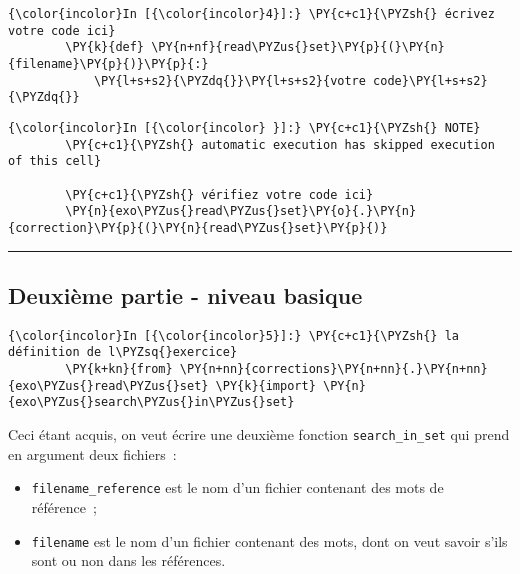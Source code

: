     \begin{Verbatim}[commandchars=\\\{\}]
{\color{incolor}In [{\color{incolor}4}]:} \PY{c+c1}{\PYZsh{} écrivez votre code ici}
        \PY{k}{def} \PY{n+nf}{read\PYZus{}set}\PY{p}{(}\PY{n}{filename}\PY{p}{)}\PY{p}{:}
            \PY{l+s+s2}{\PYZdq{}}\PY{l+s+s2}{votre code}\PY{l+s+s2}{\PYZdq{}}
\end{Verbatim}


    \begin{Verbatim}[commandchars=\\\{\}]
{\color{incolor}In [{\color{incolor} }]:} \PY{c+c1}{\PYZsh{} NOTE}
        \PY{c+c1}{\PYZsh{} automatic execution has skipped execution of this cell}
        
        \PY{c+c1}{\PYZsh{} vérifiez votre code ici}
        \PY{n}{exo\PYZus{}read\PYZus{}set}\PY{o}{.}\PY{n}{correction}\PY{p}{(}\PY{n}{read\PYZus{}set}\PY{p}{)}
\end{Verbatim}


    \begin{center}\rule{0.5\linewidth}{\linethickness}\end{center}

    \hypertarget{deuxiuxe8me-partie---niveau-basique}{%
\subsection{Deuxième partie - niveau
basique}\label{deuxiuxe8me-partie---niveau-basique}}

    \begin{Verbatim}[commandchars=\\\{\}]
{\color{incolor}In [{\color{incolor}5}]:} \PY{c+c1}{\PYZsh{} la définition de l\PYZsq{}exercice}
        \PY{k+kn}{from} \PY{n+nn}{corrections}\PY{n+nn}{.}\PY{n+nn}{exo\PYZus{}read\PYZus{}set} \PY{k}{import} \PY{n}{exo\PYZus{}search\PYZus{}in\PYZus{}set}
\end{Verbatim}


    Ceci étant acquis, on veut écrire une deuxième fonction
\texttt{search\_in\_set} qui prend en argument deux fichiers~:

\begin{itemize}
\tightlist
\item
  \texttt{filename\_reference} est le nom d'un fichier contenant des
  mots de référence~;
\item
  \texttt{filename} est le nom d'un fichier contenant des mots, dont on
  veut savoir s'ils sont ou non dans les références.
\end{itemize}

